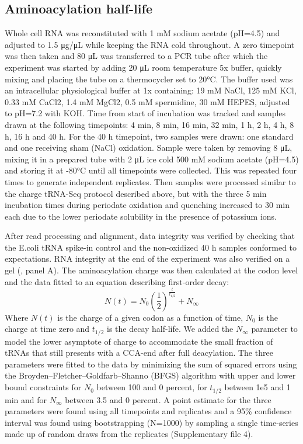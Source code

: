 \documentclass[9pt,lineno]{elife}
\begin{document}
\subsection{Aminoacylation half-life}
Whole cell RNA was reconstituted with 1 mM sodium acetate (pH=4.5) and adjusted to 1.5 μg/μL while keeping the RNA cold throughout.
A zero timepoint was then taken and 80 μL was transferred to a PCR tube after which the experiment was started by adding 20 μL room temperature 5x buffer, quickly mixing and placing the tube on a thermocycler set to 20°C.
The buffer used was an intracellular physiological buffer at 1x containing: 19 mM NaCl, 125 mM KCl, 0.33 mM CaCl2, 1.4 mM MgCl2, 0.5 mM spermidine, 30 mM HEPES, adjusted to pH=7.2 with KOH.
Time from start of incubation was tracked and samples drawn at the following timepoints: 4 min, 8 min, 16 min, 32 min, 1 h, 2 h, 4 h, 8 h, 16 h and 40 h.
For the 40 h timepoint, two samples were drawn: one standard and one receiving sham (NaCl) oxidation.
Sample were taken by removing 8 μL, mixing it in a prepared tube with 2 μL ice cold 500 mM sodium acetate (pH=4.5) and storing it at -80°C until all timepoints were collected.
This was repeated four times to generate independent replicates.
Then samples were processed similar to the charge tRNA-Seq protocol described above, but with the three 5 min incubation times during periodate oxidation and quenching increased to 30 min each due to the lower periodate solubility in the presence of potassium ions.

After read processing and alignment, data integrity was verified by checking that the E.coli tRNA spike-in control and the non-oxidized 40 h samples conformed to expectations.
RNA integrity at the end of the experiment was also verified on a gel (, panel A).
The aminoacylation charge was then calculated at the codon level and the data fitted to an equation describing first-order decay:
\begin{equation}
N(t) = N_0 \left( \frac{1}{2} \right) ^\frac{t}{t_{1/2}} + N_{\infty}
\end{equation}
Where $N(t)$ is the charge of a given codon as a function of time, $N_0$ is the charge at time zero and $t_{1/2}$ is the decay half-life.
We added the $N_{\infty}$ parameter to model the lower asymptote of charge to accommodate the small fraction of tRNAs that still presents with a CCA-end after full deacylation.
The three parameters were fitted to the data by minimizing the sum of squared errors using the Broyden–Fletcher–Goldfarb–Shanno (BFGS) algorithm with upper and lower bound constraints for $N_0$ between 100 and 0 percent, for $t_{1/2}$ between 1e5 and 1 min and for $N_{\infty}$ between 3.5 and 0 percent.
A point estimate for the three parameters were found using all timepoints and replicates and a 95\% confidence interval was found using bootstrapping (N=1000) by sampling a single time-series made up of random draws from the replicates (Supplementary file 4).
\end{document}
